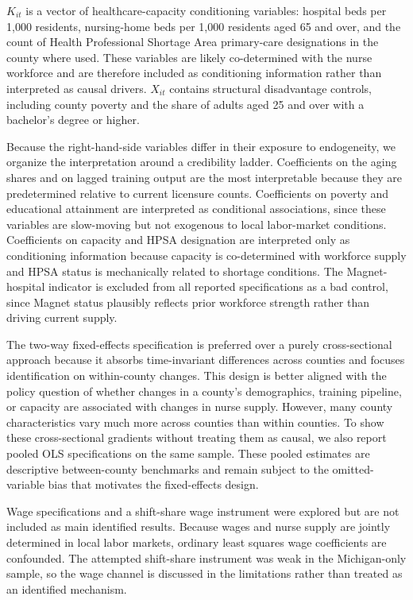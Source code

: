\documentclass[12pt]{article}
\begin{document}
  $K_{it}$ is a vector of healthcare-capacity conditioning variables:
  hospital beds per 1{,}000 residents, nursing-home beds per 1{,}000
  residents aged 65 and over, and the count of Health Professional
  Shortage Area primary-care designations in the county where used. These
  variables are likely co-determined with the nurse workforce and are
  therefore included as conditioning information rather than interpreted as
  causal drivers. $X_{it}$ contains structural disadvantage controls,
  including county poverty and the share of adults aged 25 and over with a
  bachelor's degree or higher.

  Because the right-hand-side variables differ in their exposure to
  endogeneity, we organize the interpretation around a credibility ladder.
  Coefficients on the aging shares and on lagged training output are the
  most interpretable because they are predetermined relative to current
  licensure counts. Coefficients on poverty and educational attainment are
  interpreted as conditional associations, since these variables are
  slow-moving but not exogenous to local labor-market conditions.
  Coefficients on capacity and HPSA designation are interpreted only as
  conditioning information because capacity is co-determined with workforce
  supply and HPSA status is mechanically related to shortage conditions.
  The Magnet-hospital indicator is excluded from all reported
  specifications as a bad control, since Magnet status plausibly reflects
  prior workforce strength rather than driving current supply.

  The two-way fixed-effects specification is preferred over a purely
  cross-sectional approach because it absorbs time-invariant differences
  across counties and focuses identification on within-county changes. This
  design is better aligned with the policy question of whether changes in a
  county's demographics, training pipeline, or capacity are associated with
  changes in nurse supply. However, many county characteristics vary much
  more across counties than within counties. To show these cross-sectional
  gradients without treating them as causal, we also report pooled OLS
  specifications on the same sample. These pooled estimates are descriptive
  between-county benchmarks and remain subject to the omitted-variable bias
  that motivates the fixed-effects design.

  Wage specifications and a shift-share wage instrument were explored but
  are not included as main identified results. Because wages and nurse
  supply are jointly determined in local labor markets, ordinary least
  squares wage coefficients are confounded. The attempted shift-share
  instrument was weak in the Michigan-only sample, so the wage channel is
  discussed in the limitations rather than treated as an identified
  mechanism.
\end{document}
